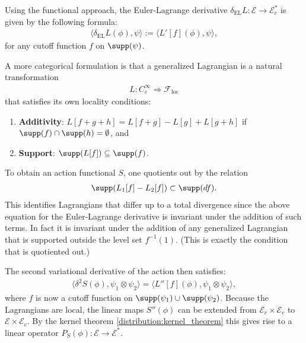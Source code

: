     Using the functional approach, the Euler-Lagrange derivative $\delta_\mathrm{EL}L:\mathcal{E}\rightarrow\mathcal{E}^*_c$ is given by the following formula:
    \begin{gather}
        \langle\delta_\mathrm{EL}L(\phi),\psi\rangle := \langle L'[f](\phi),\psi \rangle,
    \end{gather}
    for any cutoff function $f$ on $\supp(\psi)$.
    \begin{remark}[Functoriality]
        A more categorical formulation is that a generalized Lagrangian is a natural transformation
        \begin{gather}
            L:C^\infty_c\Rightarrow\mathcal{F}_\mathrm{loc}
        \end{gather}
        that satisfies its own locality conditions:
        \begin{enumerate}
            \item\textbf{Additivity}: $L[f+g+h] = L[f+g]-L[g]+L[g+h]$ if $\supp(f)\cap\supp(h)=\emptyset$, and
            \item\textbf{Support}: $\supp(L[f])\subseteq\supp(f)$.
        \end{enumerate}
        To obtain an action functional $S$, one quotients out by the relation
        \begin{gather}
            \supp(L_1[f]-L_2[f])\subset\supp(df).
        \end{gather}
        This identifies Lagrangians that differ up to a total divergence since the above equation for the Euler-Lagrange derivative is invariant under the addition of such terms. In fact it is invariant under the addition of any generalized Lagrangian that is supported outside the level set $f^{-1}(1)$. (This is exactly the condition that is quotiented out.)
    \end{remark}

    The second variational derivative of the action then satisfies:
    \begin{gather}
        \langle\delta^2S(\phi),\psi_1\otimes\psi_2 \rangle = \langle L''[f](\phi),\psi_1\otimes\psi_2 \rangle,
    \end{gather}
    where $f$ is now a cutoff function on $\supp(\psi_1)\cup\supp(\psi_2)$. Because the Lagrangians are local, the linear maps $S''(\phi)$ can be extended from $\mathcal{E}_c\times\mathcal{E}_c$ to $\mathcal{E}\times\mathcal{E}_c$. By the kernel theorem \ref{distribution:kernel_theorem} this gives rise to a linear operator $P_S(\phi):\mathcal{E}\rightarrow\mathcal{E}^*$.


